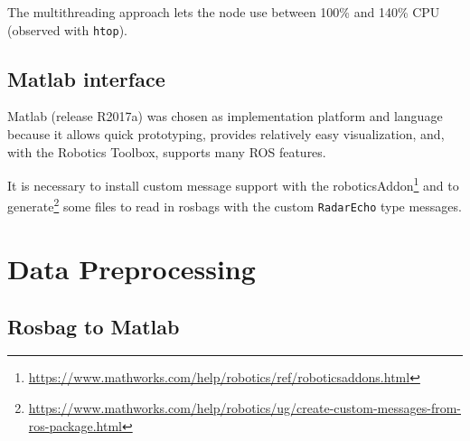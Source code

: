 \begin{samepage}
\begin{Shaded}
\begin{Highlighting}[]

\NormalTok{    [=] ()}
\NormalTok{    \{}
\NormalTok{    \}}
\NormalTok{);}
\end{Highlighting}
\end{Shaded}
\end{samepage}

The multithreading approach lets the node use between 100\% and 140\%
CPU (observed with \texttt{htop}).

\subsection{Matlab interface}\label{matlab}

Matlab (release R2017a) was chosen as implementation platform and language because it allows quick prototyping, provides relatively easy visualization, and, with the Robotics Toolbox, supports many ROS features.

It is necessary to install custom message support with the roboticsAddon\footnote{\url{https://www.mathworks.com/help/robotics/ref/roboticsaddons.html}} and to generate\footnote{\url{https://www.mathworks.com/help/robotics/ug/create-custom-messages-from-ros-package.html}} some files to read in rosbags with the custom \texttt{RadarEcho} type messages.

\section{Data Preprocessing}\label{data-preprocessing}

\subsection{Rosbag to Matlab}\label{rosbag-to-matlab}

